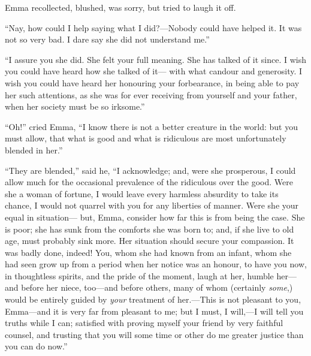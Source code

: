 Emma recollected, blushed, was sorry, but tried to laugh it off.

``Nay, how could I help saying what I did?---Nobody could have helped it.
It was not so very bad.  I dare say she did not understand me.''

``I assure you she did.  She felt your full meaning.  She has talked
of it since.  I wish you could have heard how she talked of it---%
with what candour and generosity.  I wish you could have heard her
honouring your forbearance, in being able to pay her such attentions,
as she was for ever receiving from yourself and your father,
when her society must be so irksome.''

``Oh!'' cried Emma, ``I know there is not a better creature in the world:
but you must allow, that what is good and what is ridiculous are
most unfortunately blended in her.''

``They are blended,'' said he, ``I acknowledge; and, were she prosperous,
I could allow much for the occasional prevalence of the ridiculous
over the good.  Were she a woman of fortune, I would leave every
harmless absurdity to take its chance, I would not quarrel with you
for any liberties of manner.  Were she your equal in situation---%
but, Emma, consider how far this is from being the case.  She is poor;
she has sunk from the comforts she was born to; and, if she live
to old age, must probably sink more.  Her situation should secure
your compassion.  It was badly done, indeed!  You, whom she had known
from an infant, whom she had seen grow up from a period when her
notice was an honour, to have you now, in thoughtless spirits,
and the pride of the moment, laugh at her, humble her---and before
her niece, too---and before others, many of whom (certainly \emph{some},)
would be entirely guided by \emph{your} treatment of her.---This is not
pleasant to you, Emma---and it is very far from pleasant to me;
but I must, I will,---I will tell you truths while I can;
satisfied with proving myself your friend by very faithful counsel,
and trusting that you will some time or other do me greater justice
than you can do now.''

